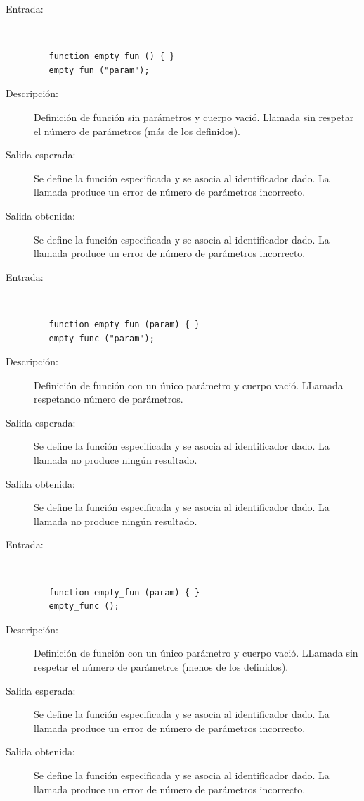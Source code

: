 \begin{framed}
	\begin{description}
		\item [Entrada:] \hfill \\
\begin{lstlisting}
   function empty_fun () { } 
   empty_fun ("param");
\end{lstlisting}
		\item [Descripción:] Definición de función sin parámetros y cuerpo vació. Llamada sin respetar el número de parámetros (más de los definidos). 
		\item [Salida esperada:] Se define la función especificada y se asocia al identificador dado. La llamada produce un error de número de parámetros incorrecto.
		\item [Salida obtenida:] Se define la función especificada y se asocia al identificador dado. La llamada produce un error de número de parámetros incorrecto.
	\end{description}
\end{framed}

\begin{framed}
	\begin{description}
		\item [Entrada:] \hfill \\
\begin{lstlisting}
   function empty_fun (param) { } 
   empty_func ("param");
\end{lstlisting}
		\item [Descripción:] Definición de función con un único parámetro y cuerpo vació. LLamada respetando número de parámetros.
		\item [Salida esperada:] Se define la función especificada y se asocia al identificador dado. La llamada no produce ningún resultado.
		\item [Salida obtenida:] Se define la función especificada y se asocia al identificador dado. La llamada no produce ningún resultado.
	\end{description}
\end{framed}

\begin{framed}
	\begin{description}
		\item [Entrada:] \hfill \\
\begin{lstlisting}
   function empty_fun (param) { } 
   empty_func ();
\end{lstlisting}
		\item [Descripción:] Definición de función con un único parámetro y cuerpo vació. LLamada sin respetar el número de parámetros (menos de los definidos).
		\item [Salida esperada:] Se define la función especificada y se asocia al identificador dado. La llamada produce un error de número de parámetros incorrecto.
		\item [Salida obtenida:] Se define la función especificada y se asocia al identificador dado. La llamada produce un error de número de parámetros incorrecto.
	\end{description}
\end{framed}

